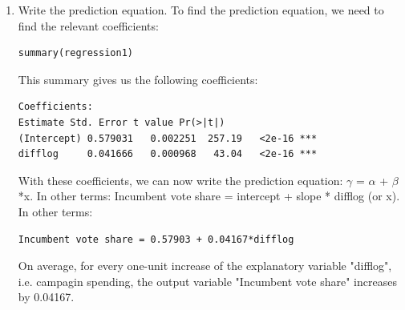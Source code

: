 \documentclass[12pt,letterpaper]{article}
\begin{document}
\begin{enumerate}
		\item Write the prediction equation.
		To find the prediction equation, we need to find the relevant coefficients: 
		
		\begin{BVerbatim}
summary(regression1)
		\end{BVerbatim}

This summary gives us the following coefficients: 

		\begin{BVerbatim}
Coefficients:
Estimate Std. Error t value Pr(>|t|)    
(Intercept) 0.579031   0.002251  257.19   <2e-16 ***
difflog     0.041666   0.000968   43.04   <2e-16 ***
		\end{BVerbatim}

With these coefficients, we can now write the prediction equation:  $\gamma$ = $\alpha$ + $\beta$*x.
In other terms: Incumbent vote share = intercept + slope * difflog (or x). 
In other terms: 

\begin{BVerbatim}
Incumbent vote share = 0.57903 + 0.04167*difflog
\end{BVerbatim}

On average, for every one-unit increase of the explanatory variable "difflog",  i.e. campagin spending, the output variable "Incumbent vote share" increases by 0.04167. 

	\end{enumerate}
	
\newpage
\end{document}
